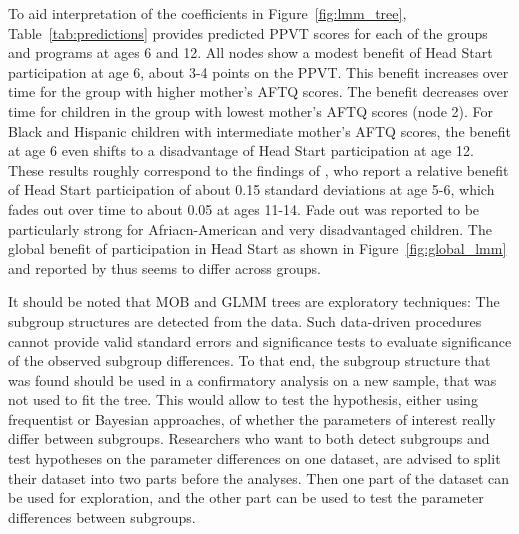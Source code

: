 \documentclass[doc,floatsintext,natbib]{apa7}
\newcommand{\edc}[1]{\textcolor{blue}{#1}}
\begin{document}
To aid interpretation of the coefficients in Figure~\ref{fig:lmm_tree}, Table~\ref{tab:predictions} provides predicted PPVT scores for each of the groups and programs at ages 6 and 12. All nodes show a modest benefit of Head Start participation at age 6, about 3-4 points on the PPVT. This benefit increases over time for the group with higher mother's AFTQ scores. The benefit decreases over time for children in the group with lowest mother's AFTQ scores (node 2). For Black and Hispanic children with intermediate mother's AFTQ scores, the benefit at age 6 even shifts to a disadvantage of Head Start participation at age 12. These results roughly correspond to the findings of \cite{Demi09}, who report a relative benefit of Head Start participation of about 0.15 standard deviations at age 5-6, which fades out over time to about 0.05 at ages 11-14. Fade out was reported to be particularly strong for Afriacn-American and very disadvantaged children. The global benefit of participation in Head Start as shown in Figure~\ref{fig:global_lmm} and reported by \cite{Demi09} thus seems to differ across groups.

It should be noted that MOB and GLMM trees are exploratory techniques: The subgroup structures are detected from the data. Such data-driven procedures cannot provide valid standard errors and significance tests to evaluate significance of the observed subgroup differences. To that end, the subgroup structure that was found should be used in a confirmatory analysis on a new sample, that was not used to fit the tree. This would allow to test the hypothesis, either using frequentist or Bayesian approaches, of whether the parameters of interest really differ between subgroups. Researchers who want to both detect subgroups and test hypotheses on the parameter differences on one dataset, are advised to split their dataset into two parts before the analyses. Then one part of the dataset can be used for exploration, and the other part can be used to test the parameter differences between subgroups. 

\end{document}
